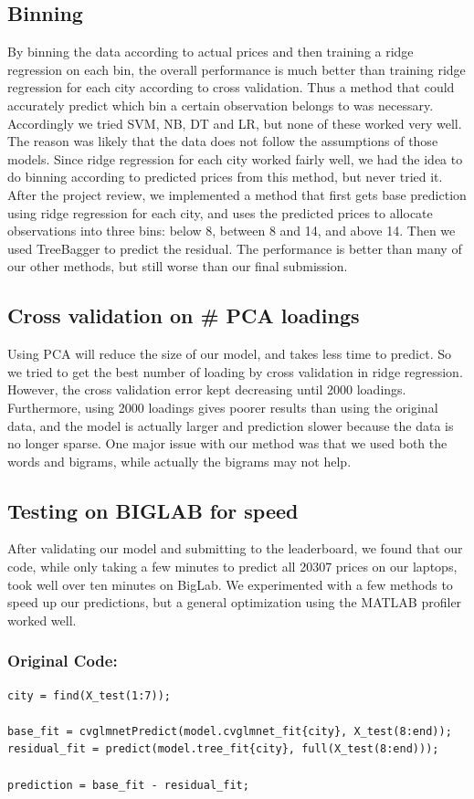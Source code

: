 \documentclass[11pt]{article}
\begin{document}
\subsection{Binning}
By binning the data according to actual prices and then training a ridge regression on each bin, the overall performance is much better than training ridge regression for each city according to cross validation. Thus a method that could accurately predict which bin a certain observation belongs to was necessary. Accordingly we tried SVM, NB, DT and LR, but none of these worked very well. The reason was likely that the data does not follow the assumptions of those models. Since ridge regression for each city worked fairly well, we had the idea to do binning according to predicted prices from this method, but never tried it. After the project review, we implemented a method that first gets base prediction using ridge regression for each city, and uses the predicted prices to allocate observations into three bins: below 8, between 8 and 14, and above 14. Then we used TreeBagger to predict the residual. The performance is better than many of our other methods, but still worse than our final submission.

\subsection{Cross validation on \# PCA loadings}
Using PCA will reduce the size of our model, and takes less time to predict. So we tried to get the best number of loading by cross validation in ridge regression. However, the cross validation error kept decreasing until 2000 loadings. Furthermore, using 2000 loadings gives poorer results than using the original data, and the model is actually larger and prediction slower because the data is no longer sparse. One major issue with our method was that we used both the words and bigrams, while actually the bigrams may not help.

\subsection{Testing on BIGLAB for speed}
After validating our model and submitting to the leaderboard, we found that our code, while only taking a few minutes to predict all 20307 prices on our laptops, took well over ten minutes on BigLab. We experimented with a few methods to speed up our predictions, but a general optimization using the MATLAB profiler worked well.
\subsubsection*{Original Code:}
\begin{lstlisting}
city = find(X_test(1:7));

base_fit = cvglmnetPredict(model.cvglmnet_fit{city}, X_test(8:end));
residual_fit = predict(model.tree_fit{city}, full(X_test(8:end)));

prediction = base_fit - residual_fit;
\end{lstlisting}
\end{document}
